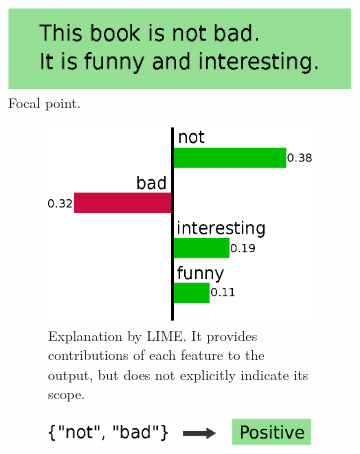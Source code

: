 \documentclass[runningheads]{llncs}
\begin{document}
\begin{figure}[tbp]
  \def\scale{0.38}
  \centering
  \begin{subfigure}[t]{0.55\textwidth}
    \centering
    \includegraphics[scale=\scale]{src/img/example-instance}
    \caption{Focal point.}\label{fig:example-instance}
    \vspace{0.5cm}
  \end{subfigure}
  \begin{subfigure}[t]{0.45\textwidth}
    \begin{subfigure}[t]{\textwidth}
      \centering
      \includegraphics[scale=\scale]{src/img/example-lime}
      \caption{%
        Explanation by LIME\@.
        It provides contributions of each feature to the output,
        but does not explicitly indicate its scope.
      }\label{fig:example-lime}
      \vspace{0.4cm}
    \end{subfigure}
    \begin{subfigure}[t]{\textwidth}
      \centering
      \includegraphics[scale=\scale]{src/img/example-anchor}
      \caption{%
}
\end{subfigure}
\end{subfigure}
\end{figure}
\end{document}
